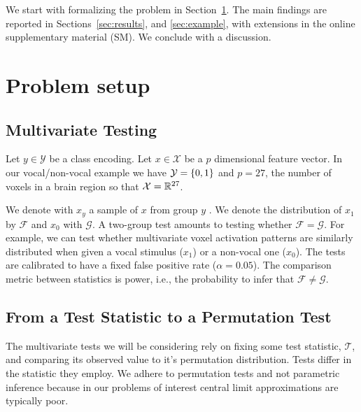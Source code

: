 \documentclass[]{bio}
\begin{document}
We start with formalizing the problem in Section~\ref{sec:problem_setup}.
The main findings are reported in Sections~\ref{sec:results}, and \ref{sec:example}, with extensions in the online supplementary material (SM). 
We conclude with a discussion.







\section{Problem setup}
\label{sec:problem_setup}


\subsection{Multivariate Testing}

Let $y \in \mathcal{Y}$ be a class encoding. 
Let $x \in \mathcal{X}$ be a $p$ dimensional feature vector. 
In our vocal/non-vocal example we have $\mathcal{Y}=\{ 0,1 \}$ and $p=27$, the number of voxels in a brain region so that $\mathcal{X}=\mathbb{R}^{27}$. 

We denote with $x_y$ a sample of $x$ from group $y$ .
We denote the distribution of $x_1$ by $\mathcal{F}$ and $x_0$ with $\mathcal{G}$.
A two-group test amounts to testing whether $\mathcal{F}=\mathcal{G}$.
For example, we can test whether multivariate voxel activation patterns are similarly distributed when given a vocal stimulus ($x_1$) or a non-vocal one ($x_0$).
The tests are calibrated to have a fixed false positive rate ($\alpha=0.05$).
The comparison metric between statistics is power, i.e., the probability to infer that $\mathcal{F}\neq\mathcal{G}$.


\subsection{From a Test Statistic to a Permutation Test}

The multivariate tests we will be considering rely on fixing some test statistic, $\mathcal{T}$, and comparing its observed value to it's permutation distribution. 
Tests differ in the statistic they employ.
We adhere to permutation tests and not parametric inference because in our problems of interest central limit approximations are typically poor.
\end{document}
